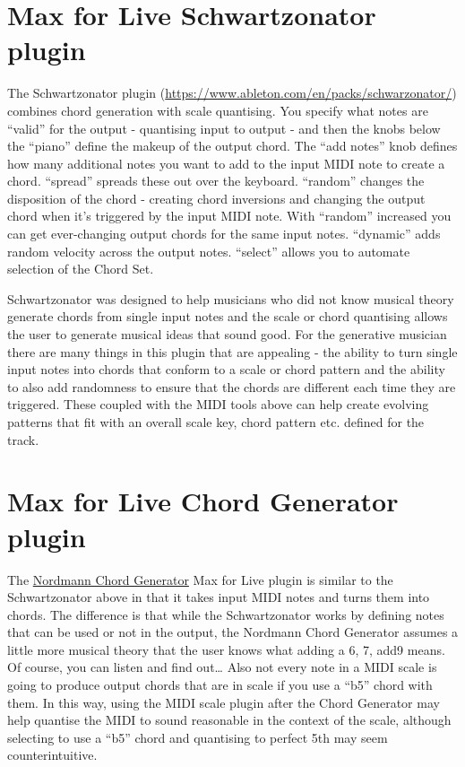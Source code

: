 \documentclass[
  12pt,
  letterpaper,
  oneside,
  open=any]{scrbook}
\makeatletter
\newcommand*\pandocbounded[1]{%
  \sbox\pandoc@box{#1}%
  \Gscale@div\@tempa{\textheight}{\dimexpr\ht\pandoc@box+\dp\pandoc@box\relax}%
  \Gscale@div\@tempb{\linewidth}{\wd\pandoc@box}%
  \ifdim\@tempb\p@<\@tempa\p@\let\@tempa\@tempb\fi%
  \ifdim\@tempa\p@<\p@\scalebox{\@tempa}{\usebox\pandoc@box}%
  \else\usebox{\pandoc@box}%
  \fi%
}
\makeatother
\begin{document}
\section{Max for Live Schwartzonator
plugin}\label{max-for-live-schwartzonator-plugin}

The Schwartzonator plugin
(\url{https://www.ableton.com/en/packs/schwarzonator/}) combines chord
generation with scale quantising. You specify what notes are ``valid''
for the output - quantising input to output - and then the knobs below
the ``piano'' define the makeup of the output chord. The ``add notes''
knob defines how many additional notes you want to add to the input MIDI
note to create a chord. ``spread'' spreads these out over the keyboard.
``random'' changes the disposition of the chord - creating chord
inversions and changing the output chord when it's triggered by the
input MIDI note. With ``random'' increased you can get ever-changing
output chords for the same input notes. ``dynamic'' adds random velocity
across the output notes. ``select'' allows you to automate selection of
the Chord Set.

Schwartzonator was designed to help musicians who did not know musical
theory generate chords from single input notes and the scale or chord
quantising allows the user to generate musical ideas that sound good.
For the generative musician there are many things in this plugin that
are appealing - the ability to turn single input notes into chords that
conform to a scale or chord pattern and the ability to also add
randomness to ensure that the chords are different each time they are
triggered. These coupled with the MIDI tools above can help create
evolving patterns that fit with an overall scale key, chord pattern etc.
defined for the track.

\pandocbounded{\texttt{[image: images/Schwarzonator.png]}}

\section{Max for Live Chord Generator
plugin}\label{max-for-live-chord-generator-plugin}

The
\href{https://maxforlive.com/library/device/917/chord-generator}{Nordmann
Chord Generator} Max for Live plugin is similar to the Schwartzonator
above in that it takes input MIDI notes and turns them into chords. The
difference is that while the Schwartzonator works by defining notes that
can be used or not in the output, the Nordmann Chord Generator assumes a
little more musical theory that the user knows what adding a 6, 7, add9
means. Of course, you can listen and find out\ldots{} Also not every
note in a MIDI scale is going to produce output chords that are in scale
if you use a ``b5'' chord with them. In this way, using the MIDI scale
plugin after the Chord Generator may help quantise the MIDI to sound
reasonable in the context of the scale, although selecting to use a
``b5'' chord and quantising to perfect 5th may seem counterintuitive.
\end{document}
